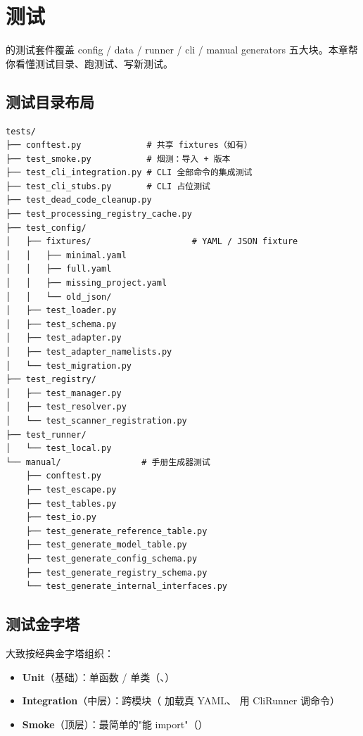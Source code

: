 
\chapter{测试}

\openbench{} 的测试套件覆盖 config / data / runner / cli / manual generators 五大块。本章帮你看懂测试目录、跑测试、写新测试。

\section{测试目录布局}

\begin{verbatim}
tests/
├── conftest.py             # 共享 fixtures（如有）
├── test_smoke.py           # 烟测：导入 + 版本
├── test_cli_integration.py # CLI 全部命令的集成测试
├── test_cli_stubs.py       # CLI 占位测试
├── test_dead_code_cleanup.py
├── test_processing_registry_cache.py
├── test_config/
│   ├── fixtures/                    # YAML / JSON fixture
│   │   ├── minimal.yaml
│   │   ├── full.yaml
│   │   ├── missing_project.yaml
│   │   └── old_json/
│   ├── test_loader.py
│   ├── test_schema.py
│   ├── test_adapter.py
│   ├── test_adapter_namelists.py
│   └── test_migration.py
├── test_registry/
│   ├── test_manager.py
│   ├── test_resolver.py
│   └── test_scanner_registration.py
├── test_runner/
│   └── test_local.py
└── manual/                # 手册生成器测试
    ├── conftest.py
    ├── test_escape.py
    ├── test_tables.py
    ├── test_io.py
    ├── test_generate_reference_table.py
    ├── test_generate_model_table.py
    ├── test_generate_config_schema.py
    ├── test_generate_registry_schema.py
    └── test_generate_internal_interfaces.py
\end{verbatim}

\section{测试金字塔}

\openbench{} 大致按经典金字塔组织：

\begin{itemize}
  \item \textbf{Unit}（基础）：单函数 / 单类（、）
  \item \textbf{Integration}（中层）：跨模块（ 加载真 YAML、 用 CliRunner 调命令）
  \item \textbf{Smoke}（顶层）：最简单的"能 import"（）
\end{itemize}

